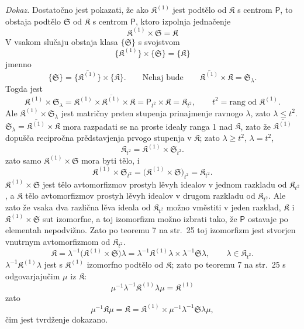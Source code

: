 \documentclass[11pt]{article}
\begin{document}
\emph{Dokaz.} Dostatočno jest pokazati, že ako \(\mathfrak K^{(1)}\) jest podtělo od \(\mathfrak K\) s centrom \(\mathsf P\), to obstaja podtělo \(\mathfrak S\) od \(\mathfrak K\) s centrom \(\mathsf P\), ktoro izpolnja jednačenje
\[
\mathfrak K^{(1)}\times\mathfrak S=\mathfrak K
\]
V vsakom slučaju obstaja klasa \(\{\mathfrak S\}\) s svojstvom
\[
\{\mathfrak K^{(1)}\}\times\{\mathfrak S\}=\{\mathfrak K\}
\]
jmenno
\[
\{\mathfrak S\}=\{\overline{\mathfrak K^{(1)}}\}\times\{\mathfrak K\}.
\qquad
\text{Nehaj bude}\qquad
\overline{\mathfrak K^{(1)}}\times\mathfrak K=\mathfrak S_\lambda.
\]
Togda jest
\[
\mathfrak K^{(1)}\times\mathfrak S_\lambda
=\mathfrak K^{(1)}\times\overline{\mathfrak K^{(1)}}\times\mathfrak K
=\mathsf P_{t^2}\times\mathfrak K
=\mathfrak K_{t^2},
\qquad
t^2=\text{rang od }\mathfrak K^{(1)}.
\]
Ale \(\mathfrak K^{(1)}\times\mathfrak S_\lambda\) jest matričny prsten stupenja prinajmenje ravnogo \(\lambda\), zato \(\lambda\leq t^2\). \(\mathfrak S_\lambda=\overline{\mathfrak K^{(1)}}\times\mathfrak K\) mora razpadati se na proste idealy ranga 1 nad \(\mathfrak K\), zato že \(\overline{\mathfrak K^{(1)}}\) dopušča recipročna prědstavjenja prvogo stupenja v \(\mathfrak K\); zato \(\lambda\geq t^2\), \(\lambda=t^2\),
\[
\mathfrak K_{t^2}=\mathfrak K^{(1)}\times\mathfrak S_{t^2}.
\]
zato samo \(\mathfrak K^{(1)}\times\mathfrak S\) mora byti tělo, i
\[
\mathfrak K^{(1)}\times\mathfrak S_{t^2}
=\bigl(\mathfrak K^{(1)}\times\mathfrak S\bigr)_{t^2}
=\mathfrak K_{t^2}.
\]
\(\mathfrak K^{(1)}\times\mathfrak S\) jest tělo avtomorfizmov prostyh lěvyh idealov v jednom razkladu od \(\mathfrak K_{t^2}\), a \(\mathfrak K\) tělo avtomorfizmov prostyh lěvyh idealov v drugom razkladu od \(\mathfrak K_{t^2}\). Ale zato že vsaka dva različna lěva ideala od \(\mathfrak K_{t^2}\) možno vměstiti v jeden razklad, \(\mathfrak K\) i \(\mathfrak K^{(1)}\times\mathfrak S\) sut izomorfne, a toj izomorfizm možno izbrati tako, že \(\mathsf P\) ostavaje po elementah nepodvižno. Zato po teoremu 7 na str.~25 toj izomorfizm jest stvorjen vnutrnym avtomorfizmom od \(\mathfrak K_{t^2}\).
\[
\mathfrak K
=\lambda^{-1}\bigl(\mathfrak K^{(1)}\times\mathfrak S\bigr)\lambda
=\lambda^{-1}\mathfrak K^{(1)}\lambda\times\lambda^{-1}\mathfrak S\lambda,
\qquad
\lambda\in\mathfrak K_{t^2}.
\]
\(\lambda^{-1}\mathfrak K^{(1)}\lambda\) jest s \(\mathfrak K^{(1)}\) izomorfno podtělo od \(\mathfrak K\); zato po teoremu 7 na str.~25 s odgovarjajučim \(\mu\) iz \(\mathfrak K\):
\[
\mu^{-1}\lambda^{-1}\mathfrak K^{(1)}\lambda\mu=\mathfrak K^{(1)}
\]
zato
\[
\mu^{-1}\mathfrak K\mu
=\mathfrak K
=\mathfrak K^{(1)}\times\mu^{-1}\lambda^{-1}\mathfrak S\lambda\mu,
\]
čim jest tvrdženje dokazano.
\end{document}
